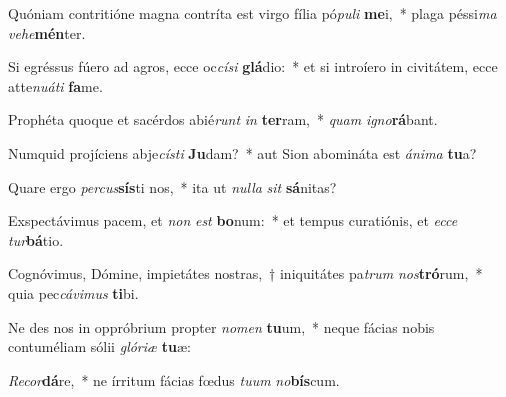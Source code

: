 \item Quóniam contritióne magna contríta est virgo fília pó\textit{pu}\textit{li} \textbf{me}i,~* plaga péssi\textit{ma} \textit{ve}\textit{he}\textbf{mén}ter.
\item Si egréssus fúero ad agros, ecce oc\textit{cí}\textit{si} \textbf{glá}dio:~* et si introíero in civitátem, ecce atte\textit{nu}\textit{á}\textit{ti} \textbf{fa}me.
\item Prophéta quoque et sacérdos abié\textit{runt} \textit{in} \textbf{ter}ram,~* \textit{quam} \textit{i}\textit{gno}\textbf{rá}bant.
\item Numquid projíciens abje\textit{cís}\textit{ti} \textbf{Ju}dam?~* aut Sion abomináta est \textit{á}\textit{ni}\textit{ma} \textbf{tu}a?
\item Quare ergo \textit{per}\textit{cus}\textbf{sís}ti nos,~* ita ut \textit{nul}\textit{la} \textit{sit} \textbf{sá}nitas?
\item Exspectávimus pacem, et \textit{non} \textit{est} \textbf{bo}num:~* et tempus curatiónis, et \textit{ec}\textit{ce} \textit{tur}\textbf{bá}tio.
\item Cognóvimus, Dómine, impietátes nostras,~† iniquitátes pa\textit{trum} \textit{nos}\textbf{tró}rum,~* quia pec\textit{cá}\textit{vi}\textit{mus} \textbf{ti}bi.
\item Ne des nos in oppróbrium propter \textit{no}\textit{men} \textbf{tu}um,~* neque fácias nobis contuméliam sólii \textit{gló}\textit{ri}\textit{æ} \textbf{tu}æ:
\item \textit{Re}\textit{cor}\textbf{dá}re,~* ne írritum fácias fœdus \textit{tu}\textit{um} \textit{no}\textbf{bís}cum.
